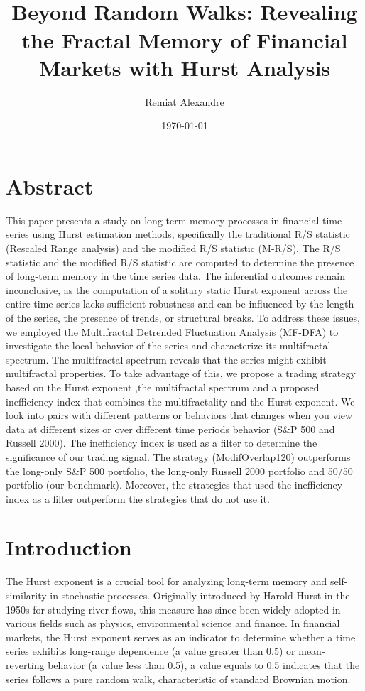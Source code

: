 \documentclass[11pt]{extarticle}
\title{
    \hspace*{-12cm}
    \vspace*{1cm}
    \protect\\
    \vspace*{1cm}
    \textbf{Beyond Random Walks: Revealing the Fractal Memory of Financial Markets with Hurst Analysis}
}
\author{Remiat Alexandre}
\date{\today}
\begin{document}

\maketitle


\newpage


\section*{Abstract}

This paper presents a study on long-term memory processes in financial time series using Hurst estimation methods,
specifically the traditional R/S statistic (Rescaled Range analysis) and the modified R/S statistic (M-R/S).
The R/S statistic and the modified R/S statistic are computed to determine the presence of long-term memory in the time series data.
The inferential outcomes remain inconclusive, as the computation of a solitary static Hurst exponent
across the entire time series lacks sufficient robustness and can be influenced by the length of the series, the presence of trends, or structural breaks.
To address these issues, we employed the Multifractal Detrended Fluctuation Analysis (MF-DFA) to investigate the
local behavior of the series and characterize its multifractal spectrum. The multifractal spectrum reveals that the series
might exhibit multifractal properties. To take advantage of this, we propose a trading strategy based on the Hurst
exponent ,the multifractal spectrum and a proposed inefficiency index that combines the multifractality and the Hurst exponent.
We look into pairs with different patterns or behaviors that changes
when you view data at different sizes or over different time periods behavior (S\&P 500 and Russell 2000).
The inefficiency index is used as a filter to determine the significance of our trading signal.
The strategy (ModifOverlap120) outperforms the long-only S\&P 500 portfolio, the long-only Russell 2000 portfolio and
50/50 portfolio (our benchmark). Moreover, the strategies that used the inefficiency index as a filter
outperform the strategies that do not use it.



\newpage

\section{Introduction}

The Hurst exponent is a crucial tool for analyzing long-term memory and self-similarity in stochastic processes.
Originally introduced by Harold Hurst in the 1950s for studying river flows, this measure has since been widely
adopted in various fields such as physics, environmental science and finance. In financial markets, the Hurst
exponent serves as an indicator to determine whether a time series exhibits long-range dependence (a value greater
than 0.5) or mean-reverting behavior (a value less than 0.5), a value equals to 0.5 indicates that the series
follows a pure random walk, characteristic of standard Brownian motion.
\end{document}
